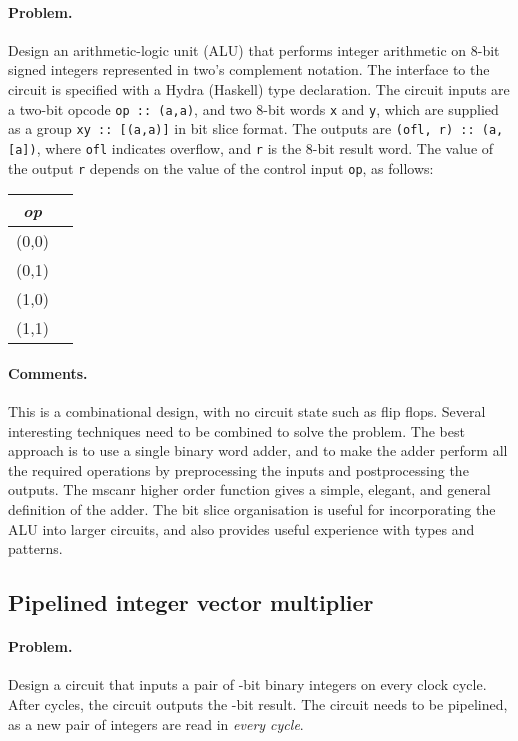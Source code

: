 \documentclass[submission,copyright,creativecommons]{eptcs}
\begin{document}
\paragraph{Problem.} Design an arithmetic-logic unit (ALU) that
performs integer arithmetic on 8-bit signed integers represented in
two's complement notation.  The interface to the circuit is
specified with a Hydra (Haskell) type declaration.  The circuit
inputs are a two-bit opcode \texttt{op :: (a,a)}, and two 8-bit
words \texttt{x} and \texttt{y}, which are supplied as a group
\texttt{xy :: [(a,a)]} in bit slice format.  The outputs are
\texttt{(ofl, r) :: (a, [a])}, where \texttt{ofl} indicates
overflow, and \texttt{r} is the 8-bit result word.  The value of
the output \texttt{r} depends on the value of the control input
\texttt{op}, as follows:
\begin{center}
\begin{tabular}{|c|c|}
\hline
  \textit{op} &  \\
\hline
  (0,0) &  \\
  (0,1) &  \\
  (1,0) &  \\
  (1,1) &  \\
\hline
\end{tabular}
\end{center}

\paragraph{Comments.}
This is a combinational design, with no circuit state such as flip
flops.  Several interesting techniques need to be combined to
solve the problem.  The best approach is to use a single binary
word adder, and to make the adder perform all the required
operations by preprocessing the inputs and postprocessing the
outputs.  The mscanr higher order function gives a simple, elegant,
and general definition of the adder.  The bit slice organisation is
useful for incorporating the ALU into larger circuits, and also
provides useful experience with types and patterns.

\subsection{Pipelined integer vector multiplier}

\paragraph{Problem.}
Design a circuit that inputs a pair of -bit binary integers on
every clock cycle.  After  cycles, the circuit outputs the -bit result.  The circuit needs to be pipelined, as a new
pair of integers are read in \emph{every cycle}.
\end{document}
